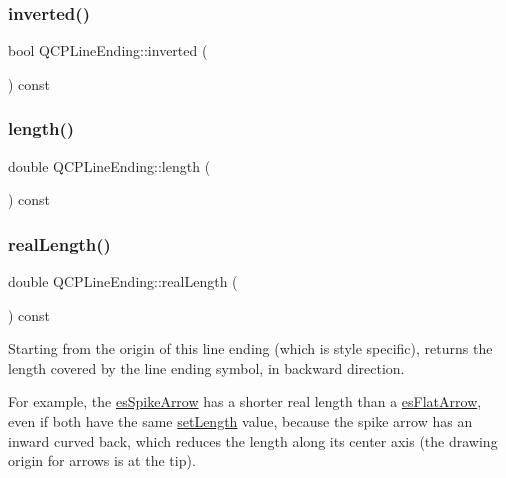 \mbox{\label{class_q_c_p_line_ending_a15a68706d298a0c9f94556f6b4db15ff}} 
\subsubsection{\texorpdfstring{inverted()}{inverted()}}
{\footnotesize\ttfamily bool Q\+C\+P\+Line\+Ending\+::inverted (\begin{DoxyParamCaption}{ }\end{DoxyParamCaption}) const\hspace{0.3cm}{\ttfamily [inline]}}

\mbox{\label{class_q_c_p_line_ending_aee9050a13fe115bd1b6794f9ad14cd72}} 
\subsubsection{\texorpdfstring{length()}{length()}}
{\footnotesize\ttfamily double Q\+C\+P\+Line\+Ending\+::length (\begin{DoxyParamCaption}{ }\end{DoxyParamCaption}) const\hspace{0.3cm}{\ttfamily [inline]}}

\mbox{\label{class_q_c_p_line_ending_acacd24d386d459b282d3c57f16a5405d}} 
\subsubsection{\texorpdfstring{realLength()}{realLength()}}
{\footnotesize\ttfamily double Q\+C\+P\+Line\+Ending\+::real\+Length (\begin{DoxyParamCaption}{ }\end{DoxyParamCaption}) const}

Starting from the origin of this line ending (which is style specific), returns the length covered by the line ending symbol, in backward direction.

For example, the \mbox{\hyperlink{class_q_c_p_line_ending_a5ef16e6876b4b74959c7261d8d4c2cd5ab9964d0d03f812d1e79de15edbeb2cbf}{es\+Spike\+Arrow}} has a shorter real length than a \mbox{\hyperlink{class_q_c_p_line_ending_a5ef16e6876b4b74959c7261d8d4c2cd5a3d7dcea2f100671727c3417142154f8f}{es\+Flat\+Arrow}}, even if both have the same \mbox{\hyperlink{class_q_c_p_line_ending_ae36fa01763751cd64b7f56c3507e935a}{set\+Length}} value, because the spike arrow has an inward curved back, which reduces the length along its center axis (the drawing origin for arrows is at the tip).

